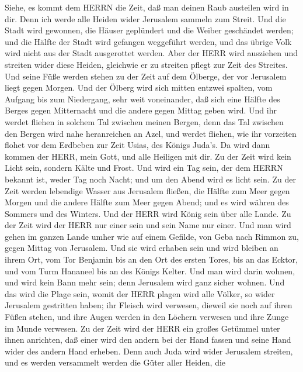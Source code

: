  Siehe, es kommt dem HERRN die Zeit, daß man deinen Raub
austeilen wird in dir.  Denn ich werde alle Heiden wider
Jerusalem sammeln zum Streit. Und die Stadt wird gewonnen, die Häuser
geplündert und die Weiber geschändet werden; und die Hälfte der Stadt
wird gefangen weggeführt werden, und das übrige Volk wird nicht aus der
Stadt ausgerottet werden.  Aber der HERR wird ausziehen und
streiten wider diese Heiden, gleichwie er zu streiten pflegt zur Zeit
des Streites.  Und seine Füße werden stehen zu der Zeit auf
dem Ölberge, der vor Jerusalem liegt gegen Morgen. Und der Ölberg wird
sich mitten entzwei spalten, vom Aufgang bis zum Niedergang, sehr weit
voneinander, daß sich eine Hälfte des Berges gegen Mitternacht und die
andere gegen Mittag geben wird.  Und ihr werdet fliehen in
solchem Tal zwischen meinen Bergen, denn das Tal zwischen den Bergen
wird nahe heranreichen an Azel, und werdet fliehen, wie ihr vorzeiten
flohet vor dem Erdbeben zur Zeit Usias, des Königs Juda's. Da wird dann
kommen der HERR, mein Gott, und alle Heiligen mit dir.  Zu
der Zeit wird kein Licht sein, sondern Kälte und Frost.  Und
wird ein Tag sein, der dem HERRN bekannt ist, weder Tag noch Nacht; und
um den Abend wird es licht sein.  Zu der Zeit werden
lebendige Wasser aus Jerusalem fließen, die Hälfte zum Meer gegen Morgen
und die andere Hälfte zum Meer gegen Abend; und es wird währen des
Sommers und des Winters.  Und der HERR wird König sein über
alle Lande. Zu der Zeit wird der HERR nur einer sein und sein Name nur
einer.  Und man wird gehen im ganzen Lande umher wie auf
einem Gefilde, von Geba nach Rimmon zu, gegen Mittag von Jerusalem. Und
sie wird erhaben sein und wird bleiben an ihrem Ort, vom Tor Benjamin
bis an den Ort des ersten Tores, bis an das Ecktor, und vom Turm
Hananeel bis an des Königs Kelter.  Und man wird darin
wohnen, und wird kein Bann mehr sein; denn Jerusalem wird ganz sicher
wohnen.  Und das wird die Plage sein, womit der HERR plagen
wird alle Völker, so wider Jerusalem gestritten haben; ihr Fleisch wird
verwesen, dieweil sie noch auf ihren Füßen stehen, und ihre Augen werden
in den Löchern verwesen und ihre Zunge im Munde verwesen. 
Zu der Zeit wird der HERR ein großes Getümmel unter ihnen anrichten, daß
einer wird den andern bei der Hand fassen und seine Hand wider des
andern Hand erheben.  Denn auch Juda wird wider Jerusalem
streiten, und es werden versammelt werden die Güter aller Heiden, die
